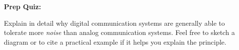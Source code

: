 \vfil \eject

\noindent
{\bf Prep Quiz:}

Explain in detail why digital communication systems are generally able to tolerate more {\it noise} than analog communication systems.  Feel free to sketch a diagram or to cite a practical example if it helps you explain the principle.




